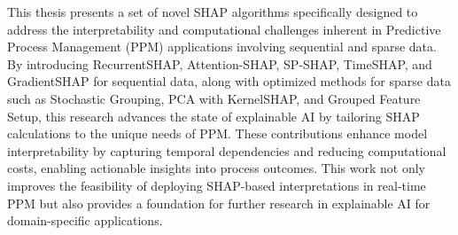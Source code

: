 This thesis presents a set of novel SHAP algorithms specifically designed to address the interpretability and computational challenges inherent in Predictive Process Management (PPM) applications involving sequential and sparse data. By introducing RecurrentSHAP, Attention-SHAP, SP-SHAP, TimeSHAP, and GradientSHAP for sequential data, along with optimized methods for sparse data such as Stochastic Grouping, PCA with KernelSHAP, and Grouped Feature Setup, this research advances the state of explainable AI by tailoring SHAP calculations to the unique needs of PPM. These contributions enhance model interpretability by capturing temporal dependencies and reducing computational costs, enabling actionable insights into process outcomes. This work not only improves the feasibility of deploying SHAP-based interpretations in real-time PPM but also provides a foundation for further research in explainable AI for domain-specific applications.